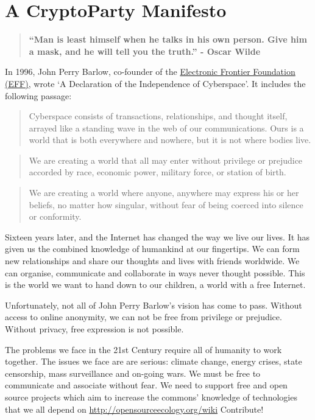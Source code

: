 \section{A CryptoParty Manifesto}

\begin{quote}
\textbf{``Man is least himself when he talks in his own person. Give him
a mask, and he will tell you the truth.'' - Oscar Wilde}

\end{quote}
In 1996, John Perry Barlow, co-founder of the
\href{https://www.eff.org/}{Electronic Frontier Foundation (EFF)}, wrote
`A Declaration of the Independence of Cyberspace'. It includes the
following passage:

\begin{quote}
Cyberspace consists of transactions, relationships, and thought itself,
arrayed like a standing wave in the web of our communications. Ours is a
world that is both everywhere and nowhere, but it is not where bodies
live.

\end{quote}
\begin{quote}
We are creating a world that all may enter without privilege or
prejudice accorded by race, economic power, military force, or station
of birth.

\end{quote}
\begin{quote}
We are creating a world where anyone, anywhere may express his or her
beliefs, no matter how singular, without fear of being coerced into
silence or conformity.

\end{quote}
Sixteen years later, and the Internet has changed the way we live our
lives. It has given us the combined knowledge of humankind at our
fingertips. We can form new relationships and share our thoughts and
lives with friends worldwide. We can organise, communicate and
collaborate in ways never thought possible. This is the world we want to
hand down to our children, a world with a free Internet.

Unfortunately, not all of John Perry Barlow's vision has come to pass.
Without access to online anonymity, we can not be free from privilege or
prejudice. Without privacy, free expression is not possible.

The problems we face in the 21st Century require all of humanity to work
together. The issues we face are are serious: climate change, energy
crises, state censorship, mass surveillance and on-going wars. We must
be free to communicate and associate without fear. We need to support
free and open source projects which aim to increase the commons'
knowledge of technologies that we all depend on
\href{http://opensourceecology.org/wiki}{http://opensourceecology.org/wiki}
Contribute!

